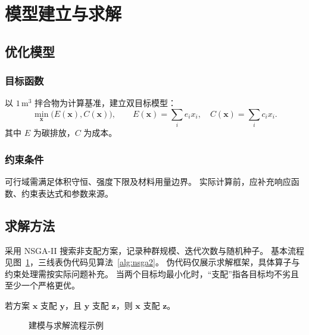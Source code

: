\section{模型建立与求解}
\label{sec:model}
\subsection{优化模型}
\subsubsection{目标函数}
以 $1\,\mathrm{m^3}$ 拌合物为计算基准，建立双目标模型：
\begin{equation}
  \min_{\boldsymbol{x}}\bigl(E(\boldsymbol{x}),C(\boldsymbol{x})\bigr),
  \qquad E(\boldsymbol{x})=\sum_i e_i x_i,\quad
  C(\boldsymbol{x})=\sum_i c_i x_i.
  \label{eq:objectives}
\end{equation}
其中 $E$ 为碳排放，$C$ 为成本。

\subsubsection{约束条件}
可行域需满足体积守恒、强度下限及材料用量边界。
实际计算前，应补充响应函数、约束表达式和参数来源。

\subsection{求解方法}
采用 NSGA-II 搜索非支配方案\citep{deb2002}，记录种群规模、迭代次数与随机种子。
基本流程见图~\ref{fig:framework}，三线表伪代码见算法~\ref{alg:nsga2}。
伪代码仅展示求解框架，具体算子与约束处理需按实际问题补充。
当两个目标均最小化时，“支配”指各目标均不劣且至少一个严格更优。
\begin{theorem}[支配关系的传递性]
  若方案 $\boldsymbol{x}$ 支配 $\boldsymbol{y}$，且 $\boldsymbol{y}$ 支配
  $\boldsymbol{z}$，则 $\boldsymbol{x}$ 支配 $\boldsymbol{z}$。
\end{theorem}
\begin{figure}[htbp]
  \centering
  
  \caption{建模与求解流程示例}
  \label{fig:framework}
\end{figure}

